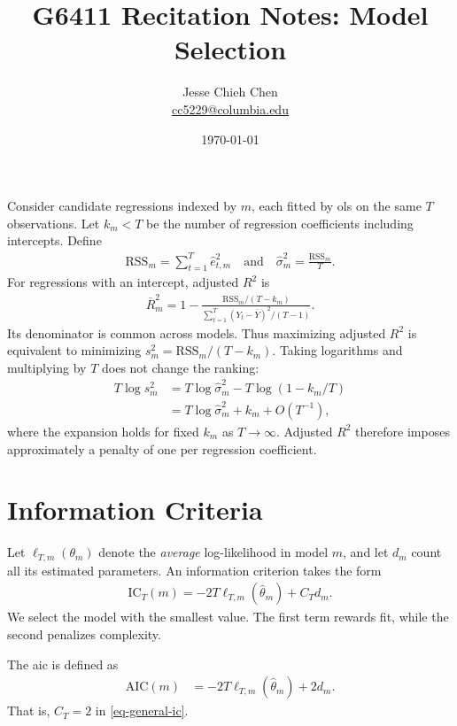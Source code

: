 \documentclass[a4paper,12pt]{article}
\title{G6411 Recitation Notes: Model Selection}
\author{Jesse Chieh Chen\\\href{mailto:cc5229@columbia.edu}{cc5229@columbia.edu}}
\date{\today}
\begin{document}
\maketitle

\noindent
Consider candidate regressions indexed by $m$,
each fitted by \gls{ols} on the same $T$ observations.
Let $k_m<T$ be the number of regression coefficients including intercepts.
Define
\begin{align}
    \mathrm{RSS}_m=\sum_{t=1}^T\widehat e_{t,m}^2
	\quad\text{and}\quad
    \widehat\sigma_m^2=\frac{\mathrm{RSS}_m}{T}.
\end{align}
For regressions with an intercept, adjusted $R^2$ is
\begin{align}
    \overline R_m^2
    =1-\frac{\mathrm{RSS}_m/(T-k_m)}
    {\sum_{t=1}^T(Y_t-\overline Y)^2/(T-1)}.
\end{align}
Its denominator is common across models.
Thus maximizing adjusted $R^2$ is equivalent to minimizing
$s_m^2=\mathrm{RSS}_m/(T-k_m)$.
Taking logarithms and multiplying by $T$ does not change the ranking:
\begin{align}
    T\log s_m^2
    &=T\log\widehat\sigma_m^2-T\log(1-k_m/T)\\
    &=T\log\widehat\sigma_m^2+k_m+O(T^{-1}),\label{eq-adjusted-penalty}
\end{align}
where the expansion holds for fixed $k_m$ as $T\to\infty$.
Adjusted $R^2$ therefore imposes approximately a penalty of one per regression coefficient.

\section{Information Criteria}

Let $\ell_{T,m}(\theta_m)$ denote the \emph{average} log-likelihood in model $m$,
and let $d_m$ count all its estimated parameters.
An information criterion takes the form
\begin{align}\label{eq-general-ic}
    \mathrm{IC}_T(m)
    =-2T\ell_{T,m}(\widehat\theta_m)+C_Td_m.
\end{align}
We select the model with the smallest value.
The first term rewards fit, while the second penalizes complexity.

\begin{definition}\label{def-aic}
	The \gls{aic} is defined as
	\begin{align}
		\mathrm{AIC}(m)&=-2T\ell_{T,m}(\widehat\theta_m)+2d_m.
	\end{align}
	That is, $C_T=2$ in \eqref{eq-general-ic}.
\end{definition}
\end{document}

